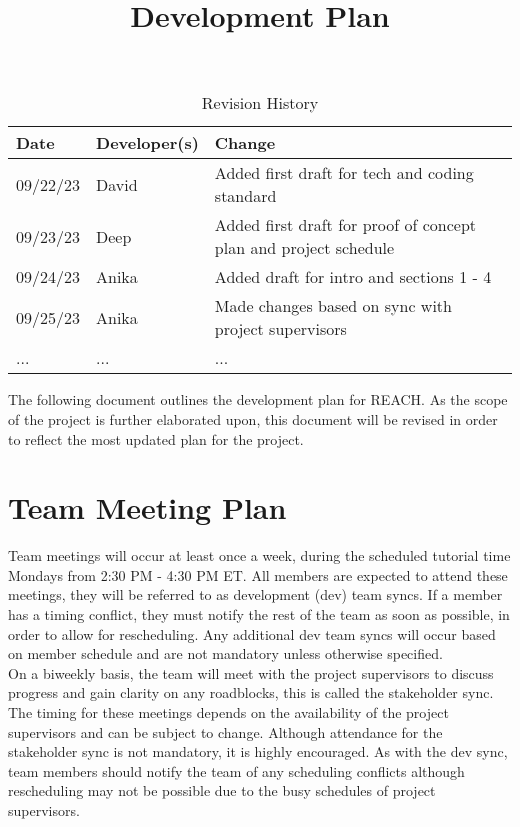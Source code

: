 \documentclass{article}
\title{Development Plan\\\progname}
\author{\authname}
\date{}
\begin{document}
\maketitle

\begin{table}[hp]
\caption{Revision History} \label{TblRevisionHistory}
\begin{tabularx}{\textwidth}{llX}
\toprule
\textbf{Date} & \textbf{Developer(s)} & \textbf{Change}\\
\midrule
09/22/23 & David & Added first draft for tech and coding standard\\
09/23/23 & Deep & Added first draft for proof of concept plan and project schedule\\
09/24/23 & Anika & Added draft for intro and sections 1 - 4 \\
09/25/23 & Anika & Made changes based on sync with project supervisors \\
... & ... & ...\\
\bottomrule
\end{tabularx}
\end{table}


\noindent The following document outlines the development plan for REACH.
As the scope of the project is further elaborated upon, 
this document will be revised in order to reflect the most updated plan for the project.\\


\section{Team Meeting Plan} 
Team meetings will occur at least once a week, during the scheduled tutorial time Mondays from 2:30 PM - 4:30 PM ET.
All members are expected to attend these meetings, they will be referred to as development (dev) team syncs. 
If a member has a timing conflict, they must notify the rest of the team as soon as possible, in order to allow for rescheduling.
Any additional dev team syncs will occur based on member schedule and are not mandatory unless otherwise specified.\\

On a biweekly basis, the team will meet with the project supervisors to discuss progress and gain clarity on any roadblocks, this is called the stakeholder sync. 
The timing for these meetings depends on the availability of the project supervisors and can be subject to change. 
Although attendance for the stakeholder sync is not mandatory, it is highly encouraged. 
As with the dev sync, team members should notify the team of any scheduling conflicts although rescheduling may not be possible due to the busy schedules of project supervisors. \\
\end{document}
